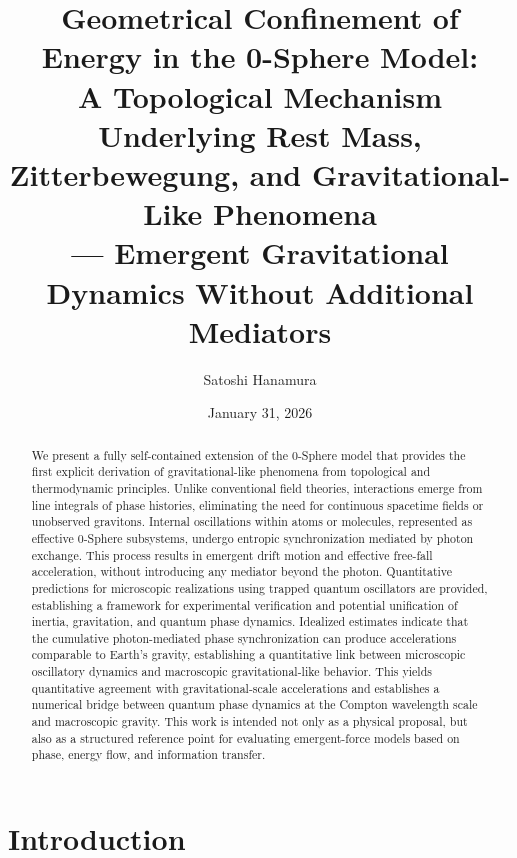 \documentclass[
 reprint,
 amsmath,amssymb,
 aps,
 prb,
]{revtex4-2}
\numberwithin{equation}{section}
\begin{document}
\title{Geometrical Confinement of Energy in the 0-Sphere Model:\\
A Topological Mechanism Underlying Rest Mass,\\
Zitterbewegung, and Gravitational-Like Phenomena\\[0.5ex]
\normalsize --- Emergent Gravitational Dynamics Without Additional Mediators}

\author{Satoshi Hanamura}
\date{January 31, 2026}

\begin{abstract}
We present a fully self-contained extension of the 0-Sphere model that provides the first explicit derivation of gravitational-like phenomena from topological and thermodynamic principles. Unlike conventional field theories, interactions emerge from line integrals of phase histories, eliminating the need for continuous spacetime fields or unobserved gravitons. Internal oscillations within atoms or molecules, represented as effective 0-Sphere subsystems, undergo entropic synchronization mediated by photon exchange. This process results in emergent drift motion and effective free-fall acceleration, without introducing any mediator beyond the photon. Quantitative predictions for microscopic realizations using trapped quantum oscillators are provided, establishing a framework for experimental verification and potential unification of inertia, gravitation, and quantum phase dynamics. Idealized estimates indicate that the cumulative photon-mediated phase synchronization can produce accelerations comparable to Earth's gravity, establishing a quantitative link between microscopic oscillatory dynamics and macroscopic gravitational-like behavior. This yields quantitative agreement with gravitational-scale accelerations and establishes a numerical bridge between quantum phase dynamics at the Compton wavelength scale and macroscopic gravity. This work is intended not only as a physical proposal, but also as a structured reference point for evaluating emergent-force models based on phase, energy flow, and information transfer.
\end{abstract}

\maketitle

\section{Introduction}
\label{sec:introduction}
\end{document}
